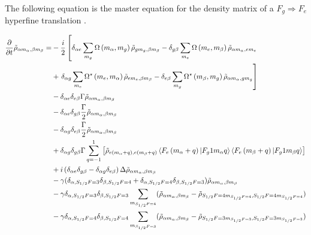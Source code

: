 \documentclass[11pt,a4paper]{article}
\begin{document}
The following equation is the master equation for the density matrix of a $F_g \Rightarrow F_e$ hyperfine translation \cite{Steck2003}.
\begin{widetext}
\begin{align}
  \frac{\partial}{\partial t} \tilde{\rho}_{\alpha m_{\alpha},\beta m_{\beta}} = &
    - \frac{i}{2} \left[ \delta_{\alpha e}\sum_{m_g} \Omega \left( m_{\alpha},m_g \right) \tilde{\rho}_{g m_g, \beta m_{\beta}} - \delta_{g \beta}\sum_{m_e} \Omega \left( m_{e},m_\beta \right) \tilde{\rho}_{\alpha m_\alpha, e m_{e}} \right.\nonumber\\ &+ \left. \delta_{\alpha g}\sum_{m_e} \Omega^{\star} \left( m_{e},m_\alpha \right) \tilde{\rho}_{e m_e, \beta m_{\beta}} - \delta_{e \beta}\sum_{m_g} \Omega^{\star} \left( m_{\beta},m_g \right) \tilde{\rho}_{\alpha m_\alpha, g m_{g}} \right] \label{eq:masterpumpfield}   \\
 &-\delta_{\alpha e}\delta_{e \beta} \Gamma \tilde{\rho}_{\alpha m_{\alpha}, \beta m_{\beta}} \label{eq:masterdissipation1}\\
  &- \delta_{\alpha e}\delta_{g \beta} \frac{\Gamma}{2} \tilde{\rho}_{\alpha m_{\alpha},\beta m_{\beta}}\label{eq:masterdissipation2}\\
  &- \delta_{\alpha g}\delta_{e \beta} \frac{\Gamma}{2} \tilde{\rho}_{\alpha m_{\alpha}, \beta m_{\beta}} \label{eq:masterdissipation3}\\
  &+ \delta_{\alpha g}\delta_{g \beta} \Gamma \sum_{q = -1}^{1} \left[ \tilde{\rho}_{e \left( m_{\alpha} + q \right), e \left(m_{\beta}+q  \right)} \braket{F_e \left( m_{\alpha}+q \right) | F_g 1 m_{\alpha} q} \braket{  F_e \left( m_{\beta} + q \right)  | F_g 1 m_{\beta} q }\right]\label{eq:masterdissipation4}\\
  &+ i \left( \delta_{\alpha e} \delta_{g \beta} - \delta_{\alpha g}\delta_{e \beta} \right) \Delta\tilde{\rho}_{\alpha m_{\alpha}, \beta m_{\beta}} \label{eq:masterfreeevolution}\\
  &- \gamma (\delta_{\alpha,S_{1/2}F=3}\delta_{\beta,S_{1/2}F=4}+\delta_{\alpha,S_{1/2}F=4}\delta_{\beta,S_{1/2}F=3}) \tilde{\rho}_{\alpha m_{\alpha}, \beta m_{\beta}}\label{eq:groundstaterelax}\\
  &- \gamma \delta_{\alpha,S_{1/2}F=3}\delta_{\beta,S_{1/2}F=3} \sum_{m_{S_{1/2}F=4}} (\tilde{\rho}_{\alpha m_{\alpha}, \beta m_{\beta}} - \tilde{\rho}_{S_{1/2}F=4 m_{S_{1/2}F=4},S_{1/2}F=4 m_{S_{1/2}F=4} })\label{eq:groundstaterelax2}\\
  &- \gamma \delta_{\alpha,S_{1/2}F=4}\delta_{\beta,S_{1/2}F=4} \sum_{m_{S_{1/2}F=3}} (\tilde{\rho}_{\alpha m_{\alpha}, \beta m_{\beta}} - \tilde{\rho}_{S_{1/2}F=3 m_{S_{1/2}F=3},S_{1/2}F=3 m_{S_{1/2}F=3} })\label{eq:groundstaterelax3}
\end{align}
\end{widetext}
\end{document}
